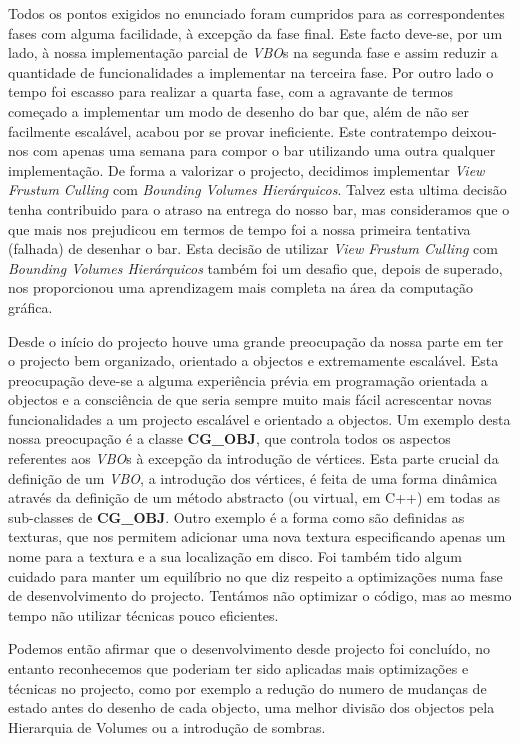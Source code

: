 \documentclass[a5paper,onecolumn, 11pt]{article}
\begin{document}
Todos os pontos exigidos no enunciado foram cumpridos para as correspondentes fases com alguma facilidade, à excepção da fase final. Este facto deve-se, por um lado, à nossa implementação parcial de \textit{VBO}s na segunda fase e assim reduzir a quantidade de funcionalidades a implementar na terceira fase. Por outro lado o tempo foi escasso para realizar a quarta fase, com a agravante de termos começado a implementar um modo de desenho do bar que, além de não ser facilmente escalável, acabou por se provar ineficiente. Este contratempo deixou-nos com apenas uma semana para compor o bar utilizando uma outra qualquer implementação. De forma a valorizar o projecto, decidimos implementar \textit{View Frustum Culling} com \textit{Bounding Volumes Hierárquicos}. Talvez esta ultima decisão tenha contribuido para o atraso na entrega do nosso bar, mas consideramos que o que mais nos prejudicou em termos de tempo foi a nossa primeira tentativa (falhada) de desenhar o bar. Esta decisão de utilizar \textit{View Frustum Culling} com \textit{Bounding Volumes Hierárquicos} também foi um desafio que, depois de superado, nos proporcionou uma aprendizagem mais completa na área da computação gráfica.

Desde o início do projecto houve uma grande preocupação da nossa parte em ter o projecto bem organizado, orientado a objectos e extremamente escalável. Esta preocupação deve-se a alguma experiência prévia em programação orientada a objectos e a consciência de que seria sempre muito mais fácil acrescentar novas funcionalidades a um projecto escalável e orientado a objectos. Um exemplo desta nossa preocupação é a classe \textbf{CG\_OBJ}, que controla todos os aspectos referentes aos \textit{VBO}s à excepção da introdução de vértices. Esta parte crucial da definição de um \textit{VBO}, a introdução dos vértices, é feita de uma forma dinâmica através da definição de um método abstracto (ou virtual, em C++) em todas as sub-classes de \textbf{CG\_OBJ}. Outro exemplo é a forma como são definidas as texturas, que nos permitem adicionar uma nova textura especificando apenas um nome para a textura e a sua localização em disco. Foi também tido algum cuidado para manter um equilíbrio no que diz respeito a optimizações numa fase de desenvolvimento do projecto. Tentámos não optimizar o código, mas ao mesmo tempo não utilizar técnicas pouco eficientes.

Podemos então afirmar que o desenvolvimento desde projecto foi concluído, no entanto reconhecemos que poderiam ter sido aplicadas mais optimizações e técnicas no projecto, como por exemplo a redução do numero de mudanças de estado antes do desenho de cada objecto, uma melhor divisão dos objectos pela Hierarquia de Volumes ou a introdução de sombras.
\end{document}
